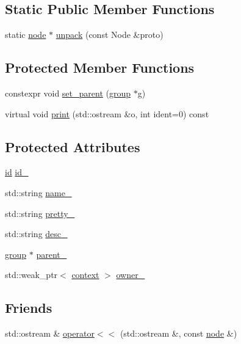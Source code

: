 \subsection*{Static Public Member Functions}
\begin{DoxyCompactItemize}
\item 
static \hyperlink{classtelegraph_1_1node}{node} $\ast$ \hyperlink{classtelegraph_1_1node_a2a2ddaf1b7210b1e69f63adcc1d83fa5}{unpack} (const Node \&proto)
\end{DoxyCompactItemize}
\subsection*{Protected Member Functions}
\begin{DoxyCompactItemize}
\item 
constexpr void \hyperlink{classtelegraph_1_1node_ae0f1bd6f97ea3e1f21940a7eebb70fab}{set\+\_\+parent} (\hyperlink{classtelegraph_1_1group}{group} $\ast$g)
\item 
virtual void \hyperlink{classtelegraph_1_1node_a70ae6b3d07132abcc4022a7ac9facf6b}{print} (std\+::ostream \&o, int ident=0) const
\end{DoxyCompactItemize}
\subsection*{Protected Attributes}
\begin{DoxyCompactItemize}
\item 
\hyperlink{classtelegraph_1_1node_a90bc576d668ed141d5354a06aa9c8d9a}{id} \hyperlink{classtelegraph_1_1node_abbc7178e6f854f475ac04fab89afe8ed}{id\+\_\+}
\item 
std\+::string \hyperlink{classtelegraph_1_1node_a14e3a8896e5cda1ad3e91186009e4a83}{name\+\_\+}
\item 
std\+::string \hyperlink{classtelegraph_1_1node_a6d308459f7de904b54a1a551b3be5cb7}{pretty\+\_\+}
\item 
std\+::string \hyperlink{classtelegraph_1_1node_ade724e97cdd76b83c5de499b62f91ecb}{desc\+\_\+}
\item 
\hyperlink{classtelegraph_1_1group}{group} $\ast$ \hyperlink{classtelegraph_1_1node_a875057ad03af20786456cffe6d5b22d9}{parent\+\_\+}
\item 
std\+::weak\+\_\+ptr$<$ \hyperlink{classtelegraph_1_1context}{context} $>$ \hyperlink{classtelegraph_1_1node_a5419854e28d2b852ecaf964849220f9f}{owner\+\_\+}
\end{DoxyCompactItemize}
\subsection*{Friends}
\begin{DoxyCompactItemize}
\item 
std\+::ostream \& \hyperlink{classtelegraph_1_1node_ac75a0e79c8f8f6dfa9fa8cd9d438325f}{operator$<$$<$} (std\+::ostream \&, const \hyperlink{classtelegraph_1_1node}{node} \&)
\end{DoxyCompactItemize}


